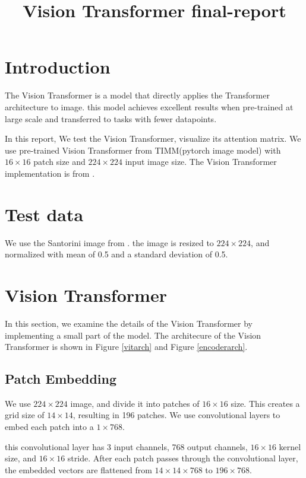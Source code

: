\documentclass[extendedabs]{bmvc2k}
\begin{document}
\title{Vision Transformer final-report}

 

\maketitle
\noindent

\section{Introduction}
The Vision Transformer\cite{vit} is a model that directly applies the Transformer\cite{transformer} architecture to image. this model achieves excellent results when pre-trained at large scale and transferred to tasks with fewer datapoints.

In this report, We test the Vision Transformer, visualize its attention matrix. We use pre-trained Vision Transformer from TIMM(pytorch image model)\cite{rw2019timm} with $16\times16$ patch size and $224\times224$ input image size. The Vision Transformer implementation is from \cite{rw2019timmvit}.
\section{Test data}
We use the Santorini image from \cite{santorini}. the image is resized to $224\times224$, and normalized with mean of 0.5 and a standard deviation of 0.5.
\section{Vision Transformer}
In this section, we examine the details of the Vision Transformer by implementing a small part of the model. The architecure of the Vision Transformer is shown in Figure \ref{vitarch} and Figure \ref{encoderarch}.
\subsection{Patch Embedding}
We use $224\times224$ image, and divide it into patches of $16\times16$ size. This creates a grid size of $14\times14$, resulting in 196 patches. We use convolutional layers to embed each patch into a $1\times768$. 

this convolutional layer has 3 input channels, 768 output channels, $16\times16$ kernel size, and $16\times16$ stride. After each patch passes through the convolutional layer, the embedded vectors are flattened from $14\times14\times768$ to $196\times768$.
\end{document}
